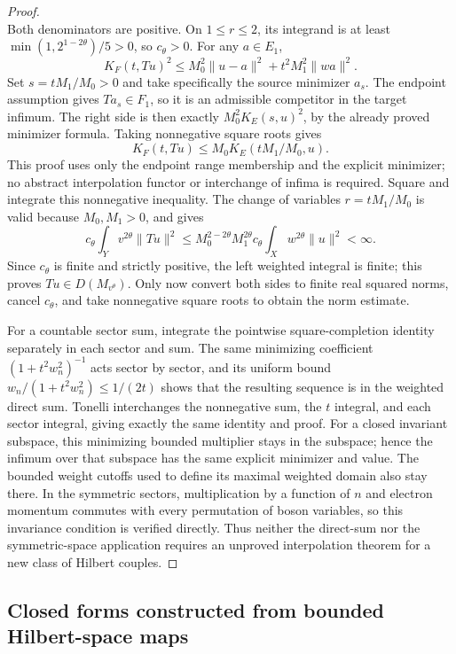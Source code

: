 \documentclass[11pt,a4paper]{article}
\theoremstyle{definition}
\theoremstyle{remark}
\begin{document}
\begin{proof}
\[\]
Both denominators are positive. On $1\leq r\leq2$, its integrand is
at least $\min(1,2^{1-2\theta})/5>0$, so $c_\theta>0$. For any $a\in E_1$,
\[
 K_F(t,Tu)^2\leq M_0^2\|u-a\|^2+t^2M_1^2\|wa\|^2.
\]
Set $s=tM_1/M_0>0$ and take specifically the source minimizer
$a_s$. The endpoint assumption gives $Ta_s\in F_1$, so it is an
admissible competitor in the target infimum. The right side is then
exactly $M_0^2K_E(s,u)^2$, by the already proved minimizer formula.
Taking nonnegative square roots gives
\[
 K_F(t,Tu)\leq M_0K_E(tM_1/M_0,u).
\]
This proof uses only the endpoint range membership and the explicit
minimizer; no abstract interpolation functor or interchange of
infima is required.
Square and integrate this nonnegative inequality. The change of
variables $r=tM_1/M_0$ is valid because $M_0,M_1>0$, and gives
\[
 c_\theta\int_Y v^{2\theta}\|Tu\|^2
 \leq M_0^{2-2\theta}M_1^{2\theta}
       c_\theta\int_X w^{2\theta}\|u\|^2<\infty.
\]
Since $c_\theta$ is finite and strictly positive, the left weighted
integral is finite; this proves $Tu\in D(M_{v^\theta})$. Only now
convert both sides to finite real squared norms, cancel $c_\theta$,
and take nonnegative square roots to obtain the norm estimate.

For a countable sector sum, integrate the pointwise square-completion
identity separately in each sector and sum. The same minimizing
coefficient $(1+t^2w_n^2)^{-1}$ acts sector by sector, and its
uniform bound $w_n/(1+t^2w_n^2)\leq1/(2t)$ shows that the resulting
sequence is in the weighted direct sum. Tonelli interchanges the
nonnegative sum, the $t$ integral, and each sector integral, giving
exactly the same identity and proof. For a closed invariant subspace,
this minimizing bounded multiplier stays in the subspace; hence the
infimum over that subspace has the same explicit minimizer and value.
The bounded weight cutoffs used to define its maximal weighted domain
also stay there. In the symmetric sectors, multiplication by a function
of $n$ and electron momentum commutes with every permutation of boson
variables, so this invariance condition is verified directly. Thus
neither the direct-sum nor the symmetric-space application requires
an unproved interpolation theorem for a new class of Hilbert couples.
\end{proof}


\subsection{Closed forms constructed from bounded Hilbert-space maps}
\end{document}
